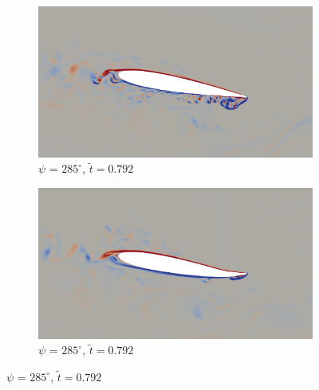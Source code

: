 \begin{figure}[H]
	\begin{subfigure}[b]{0.4\textwidth}
		\centering
		\includegraphics[width=1\textwidth]{figures/zonal_adapt_results/AC/mu_1pt5/baseline/phase_285.png}
		\caption{ $\psi$ = $285^\circ$, $\tilde{t}=0.792$}
		\label{fig:mu_1pt5_baseline_psi285}
	\end{subfigure}
	\begin{subfigure}[b]{0.4\textwidth}
		\centering
		\includegraphics[width=1\textwidth]{figures/zonal_adapt_results/AC/mu_1pt5/AC/phase_285.png}
		\caption{ $\psi$ = $285^\circ$,  $\tilde{t}=0.792$}
		\label{fig:mu_1pt5_AC_psi285}
	\end{subfigure}
	
	
	

\end{figure}
